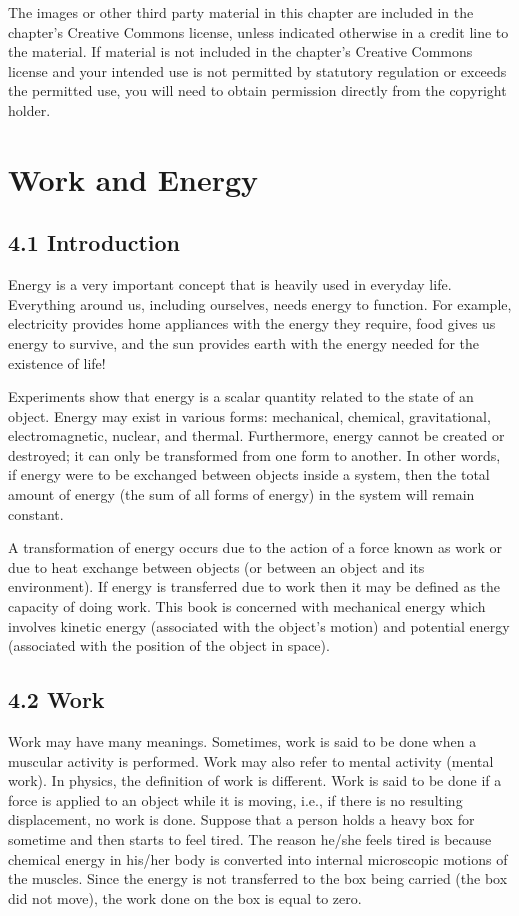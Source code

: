 \documentclass[10pt]{article}
\begin{document}
The images or other third party material in this chapter are included in the chapter's Creative Commons license, unless indicated otherwise in a credit line to the material. If material is not included in the chapter's Creative Commons license and your intended use is not permitted by statutory regulation or exceeds the permitted use, you will need to obtain permission directly from the copyright holder.

\section*{Work and Energy}
\subsection*{4.1 Introduction}
Energy is a very important concept that is heavily used in everyday life. Everything around us, including ourselves, needs energy to function. For example, electricity provides home appliances with the energy they require, food gives us energy to survive, and the sun provides earth with the energy needed for the existence of life!

Experiments show that energy is a scalar quantity related to the state of an object. Energy may exist in various forms: mechanical, chemical, gravitational, electromagnetic, nuclear, and thermal. Furthermore, energy cannot be created or destroyed; it can only be transformed from one form to another. In other words, if energy were to be exchanged between objects inside a system, then the total amount of energy (the sum of all forms of energy) in the system will remain constant.

A transformation of energy occurs due to the action of a force known as work or due to heat exchange between objects (or between an object and its environment). If energy is transferred due to work then it may be defined as the capacity of doing work. This book is concerned with mechanical energy which involves kinetic energy (associated with the object's motion) and potential energy (associated with the position of the object in space).

\subsection*{4.2 Work}
Work may have many meanings. Sometimes, work is said to be done when a muscular activity is performed. Work may also refer to mental activity (mental work). In physics, the definition of work is different. Work is said to be done if a force is applied to an object while it is moving, i.e., if there is no resulting displacement, no work is done. Suppose that a person holds a heavy box for sometime and then starts to feel tired. The reason he/she feels tired is because chemical energy in his/her body is converted into internal microscopic motions of the muscles. Since the energy is not transferred to the box being carried (the box did not move), the work done on the box is equal to zero.
\end{document}
